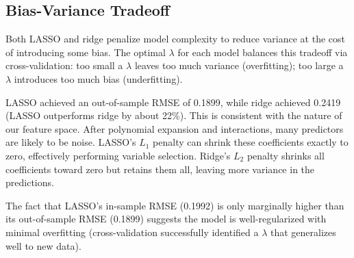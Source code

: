 \documentclass{article}
\begin{document}
\subsection*{Bias-Variance Tradeoff}

Both LASSO and ridge penalize model complexity to reduce variance at the cost of introducing some bias. The optimal $\lambda$ for each model balances this tradeoff via cross-validation: too small a $\lambda$ leaves too much variance (overfitting); too large a $\lambda$ introduces too much bias (underfitting).

LASSO achieved an out-of-sample RMSE of 0.1899, while ridge achieved 0.2419 (LASSO outperforms ridge by about 22\%). This is consistent with the nature of our feature space. After polynomial expansion and interactions, many predictors are likely to be noise. LASSO's $L_1$ penalty can shrink these coefficients exactly to zero, effectively performing variable selection. Ridge's $L_2$ penalty shrinks all coefficients toward zero but retains them all, leaving more variance in the predictions.

The fact that LASSO's in-sample RMSE (0.1992) is only marginally higher than its out-of-sample RMSE (0.1899) suggests the model is well-regularized with minimal overfitting (cross-validation successfully identified a $\lambda$ that generalizes well to new data).
\end{document}
